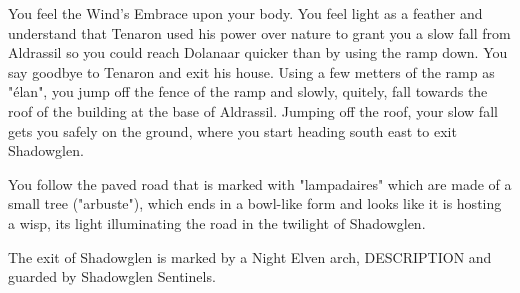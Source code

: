 You feel the Wind's Embrace upon your body. You feel light as a feather and understand that Tenaron used his power over nature to grant you a slow fall from Aldrassil so you could reach Dolanaar quicker than by using the ramp down. You say goodbye to Tenaron and exit his house. Using a few metters of the ramp as "élan", you jump off the fence of the ramp and slowly, quitely, fall towards the roof of the building at the base of Aldrassil. %
Jumping off the roof, your slow fall gets you safely on the ground, where you start heading south east to exit Shadowglen. %

You follow the paved road that is marked with "lampadaires" which are made of a small tree ("arbuste"), which ends in a bowl-like form and looks like it is hosting a wisp, its light illuminating the road in the twilight of Shadowglen.

The exit of Shadowglen is marked by a Night Elven arch, DESCRIPTION and guarded by Shadowglen Sentinels.
